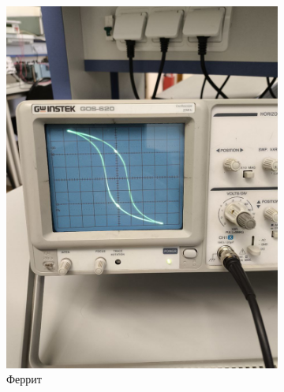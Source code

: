 \documentclass[a4paper]{article}
\begin{document}
\begin{figure}[htbp]
    \centering 
    
    \begin{subfigure}[b]{0.3\textwidth} 
        \includegraphics[width=\linewidth]{p5.jpg} 
        \caption{Феррит} 
        \label{fig:image1}
    \end{subfigure}
\hfill 
\begin{subfigure}[b]{0.3\textwidth}

\end{subfigure}
\end{figure}
\end{document}

